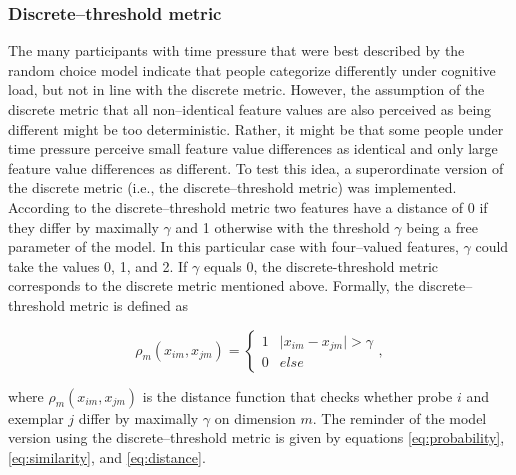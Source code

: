 \documentclass[a4paper,man,natbib]{apa6}
\begin{document}
\subsubsection{Discrete--threshold metric}
The many participants with time pressure that were best described by the random choice model indicate that people categorize differently under cognitive load, but not in line with the discrete metric. However, the assumption of the discrete metric that all non--identical feature values are also perceived as being different might be too deterministic. Rather, it might be that some people under time pressure perceive small feature value differences as identical and only large feature value differences as different. 
To test this idea, a superordinate version of the discrete metric (i.e., the discrete--threshold metric) was implemented. According to the discrete--threshold metric two features have a distance of 0 if they differ by maximally $\gamma$ and 1 otherwise with the threshold $\gamma$ being a free parameter of the model. In this particular case with four--valued features, $\gamma$ could take the values 0, 1, and 2. If $\gamma$ equals 0, the discrete-threshold metric corresponds to the discrete metric mentioned above. Formally, the discrete--threshold metric is defined as

\begin{equation}
\rho_{m}(x_{im}, x_{jm}) = 
\begin{cases}
	1 & \mid x_{im} - x_{jm} \mid > \gamma \\
	0 & else 
\end{cases},
\end{equation}

where $\rho_{m}(x_{im}, x_{jm})$ is the distance function that checks whether probe $i$ and exemplar $j$ differ by maximally $\gamma$ on dimension $m$. The reminder of the model version using the discrete--threshold metric is given by equations \ref{eq:probability}, \ref{eq:similarity}, and \ref{eq:distance}. 
\end{document}
